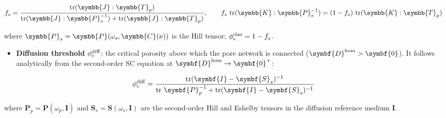 \documentclass[
  a4paper,
  numbers=noendperiod,
  DIV=12]{scrreprt}
\providecommand{\tightlist}{%
  \setlength{\itemsep}{0pt}\setlength{\parskip}{0pt}}
\newcommand{\uu}[1]{{\symbf{{#1}}}}
\newcommand{\uuuu}[1]{{\symbb{{#1}}}}
\DeclareMathOperator{\tr}{tr}
\begin{document}
\[
f_s = \frac{\tr(\uuuu{J}:\uuuu{T}_p)}{\tr(\uuuu{J}:\uuuu{P}_s^{-1})+\tr(\uuuu{J}:\uuuu{T}_p)},
\qquad
f_s\,\tr(\uuuu{K}:\uuuu{P}_s^{-1}) = (1-f_s)\,\tr(\uuuu{K}:\uuuu{T}_p)
\]

where \(\uuuu{P}_s=\uuuu{P}(\omega_s,\uuuu{C}(\nu))\) is the Hill
tensor; \(\phi_e^{\rm elas}=1-f_s\).

\begin{itemize}
\tightlist
\item
  \textbf{Diffusion threshold} \(\phi_e^{\rm diff}\): the critical
  porosity above which the pore network is connected
  (\(\uu{D}^{\rm hom}>\uu{0}\)). It follows analytically from the
  second-order SC equation at \(\uu{D}^{\rm hom}\to\uu{0}^+\):
\end{itemize}

\[
\phi_e^{\rm diff} = \frac{\tr(\uu{I}-\uu{S}_s)^{-1}}{\tr\,\uu{P}_p^{-1}+\tr(\uu{I}-\uu{S}_s)^{-1}}
\]

where \(\uu{P}_p=\uu{P}(\omega_p,\uu{I})\) and
\(\uu{S}_s=\uu{S}(\omega_s,\uu{I})\) are the second-order Hill and
Eshelby tensors in the diffusion reference medium \(\uu{I}\).
\end{document}
